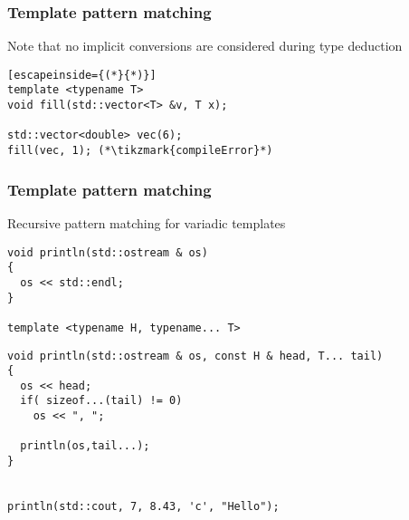 \documentclass[14pt,a4paper,dvipsnames,usenames]{beamer}
\begin{document}
\begin{frame}[fragile]
  \frametitle{Template pattern matching}

  Note that no implicit conversions are considered during type deduction

  \vspace{.5cm}
  \begin{lstlisting}[escapeinside={(*}{*)}]
template <typename T>
void fill(std::vector<T> &v, T x); 

std::vector<double> vec(6);
fill(vec, 1); (*\tikzmark{compileError}*)
  \end{lstlisting}

  \vspace{.5cm}
  \begin{overlayarea}{\textwidth}{2cm}
  \end{overlayarea}


\end{frame}

\begin{frame}[fragile]
  \frametitle{Template pattern matching}

  Recursive pattern matching for variadic templates

  \vspace{.5cm}

  \begin{lstlisting}[basicstyle=\ttfamily\fontsize{8pt}{8pt}\selectfont,morekeywords={ostream}]
void println(std::ostream & os)
{
  os << std::endl;
}

template <typename H, typename... T>
  \end{lstlisting}
  \vspace*{-.4cm}
  \begin{lstlisting}[basicstyle=\ttfamily\fontsize{8pt}{8pt}\selectfont,morekeywords={H,T,ostream}]
void println(std::ostream & os, const H & head, T... tail)
{
  os << head;
  if( sizeof...(tail) != 0)
    os << ", ";

  println(os,tail...);
}


println(std::cout, 7, 8.43, 'c', "Hello");
  \end{lstlisting}
  
\end{frame}
\end{document}
